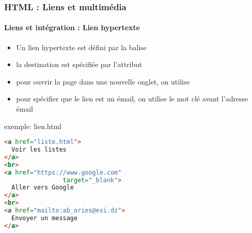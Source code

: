 \documentclass[xcolor=table]{beamer}
\begin{document}
\begin{frame}[fragile]
\frametitle{HTML : Liens et multimédia}
\framesubtitle{Liens et intégration : Lien hypertexte}

\begin{minipage}{0.50\textwidth} 
	\begin{itemize}
		\item Un lien hypertexte est défini par la balise  
		\item la destination est spécifiée par l'attribut 
		\item pour ouvrir la page dans une nouvelle onglet, on utilise 
		\item pour spécifier que le lien est un émail, on utilise le mot clé  avant l'adresse émail
	\end{itemize}
\end{minipage}
%
\begin{minipage}{0.49\textwidth}
\begin{exampleblock}{exemple: lien.html}
\lstset{escapeinside=**}
\scriptsize\bfseries\vspace{-6pt}
\begin{lstlisting}[language={html}]
<a href="liste.html">
  Voir les listes
</a>
<br>
<a href="https://www.google.com" 
                target="_blank">
  Aller vers Google
</a>
<br>
<a href="mailto:ab_aries@esi.dz">
  Envoyer un message
</a>
\end{lstlisting}\vspace{-6pt}
\end{exampleblock}
\end{minipage}

\end{frame}
\end{document}
